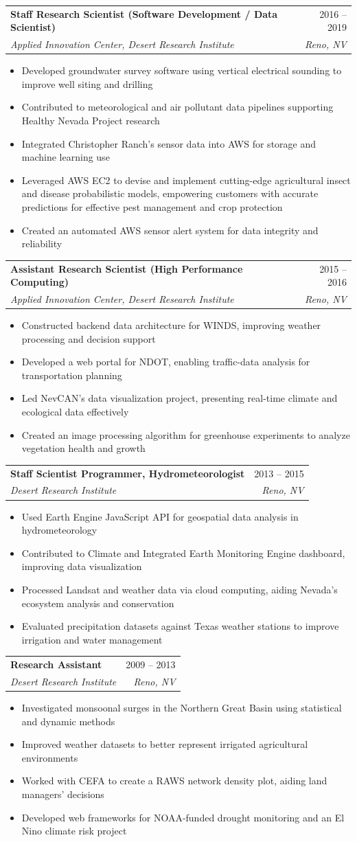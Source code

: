 \documentclass[letterpaper,11pt]{article}
\makeatletter
\newcommand{\resumeItem}[1]{
  \item\small{
    {#1 \vspace{-2pt}}
  }
}
\newcommand{\resumeSubheading}[4]{
  \vspace{-2pt}\item
    \begin{tabular*}{0.97\textwidth}[t]{l@{\extracolsep{\fill}}r}
      \textbf{#1} & #2 \\
      \textit{\small#3} & \textit{\small #4} \\
    \end{tabular*}\vspace{-7pt}
}
\newcommand{\resumeItemListStart}{\begin{itemize}}
\newcommand{\resumeItemListEnd}{\end{itemize}\vspace{-5pt}}
\makeatother
\begin{document}
    \resumeSubheading
      {Staff Research Scientist (Software Development / Data Scientist)}{2016 -- 2019}
      {Applied Innovation Center, Desert Research Institute}{Reno, NV}
      \resumeItemListStart
        \resumeItem{Developed groundwater survey software using vertical electrical sounding to improve well siting and drilling}
        \resumeItem{Contributed to meteorological and air pollutant data pipelines supporting Healthy Nevada Project research}
        \resumeItem{Integrated Christopher Ranch's sensor data into AWS for storage and machine learning use}
        \resumeItem{Leveraged AWS EC2 to devise and implement cutting-edge agricultural insect and disease probabilistic models, empowering customers with accurate predictions for effective pest management and crop protection}
        \resumeItem{Created an automated AWS sensor alert system for data integrity and reliability}
      \resumeItemListEnd

    \resumeSubheading
      {Assistant Research Scientist (High Performance Computing)}{2015 -- 2016}
      {Applied Innovation Center, Desert Research Institute}{Reno, NV}
      \resumeItemListStart
        \resumeItem{Constructed backend data architecture for WINDS, improving weather processing and decision support}
        \resumeItem{Developed a web portal for NDOT, enabling traffic-data analysis for transportation planning}
        \resumeItem{Led NevCAN's data visualization project, presenting real-time climate and ecological data effectively}
        \resumeItem{Created an image processing algorithm for greenhouse experiments to analyze vegetation health and growth}
      \resumeItemListEnd

    \resumeSubheading
      {Staff Scientist Programmer, Hydrometeorologist}{2013 -- 2015}
      {Desert Research Institute}{Reno, NV}
      \resumeItemListStart
        \resumeItem{Used Earth Engine JavaScript API for geospatial data analysis in hydrometeorology}
        \resumeItem{Contributed to Climate and Integrated Earth Monitoring Engine dashboard, improving data visualization}
        \resumeItem{Processed Landsat and weather data via cloud computing, aiding Nevada's ecosystem analysis and conservation}
        \resumeItem{Evaluated precipitation datasets against Texas weather stations to improve irrigation and water management}
      \resumeItemListEnd

    \resumeSubheading
      {Research Assistant}{2009 -- 2013}
      {Desert Research Institute}{Reno, NV}
      \resumeItemListStart
        \resumeItem{Investigated monsoonal surges in the Northern Great Basin using statistical and dynamic methods}
        \resumeItem{Improved weather datasets to better represent irrigated agricultural environments}
        \resumeItem{Worked with CEFA to create a RAWS network density plot, aiding land managers' decisions}
        \resumeItem{Developed web frameworks for NOAA-funded drought monitoring and an El Nino climate risk project}
      \resumeItemListEnd
\end{document}
